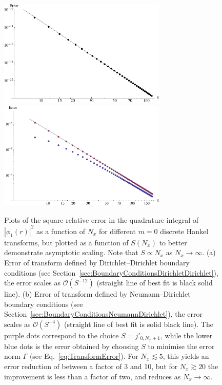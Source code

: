 \documentclass[aip,amsmath,amssymb,reprint,twocolumn]{revtex4-1}
\newcommand{\abs}[1]{\left|#1\right|}
\newcommand{\Nx}{{N_{x}}}
\begin{document}
\begin{figure}
  \includegraphics[width=8cm]{BesselDirichletErrorScaling}
  \includegraphics[width=8cm]{BesselNeumannErrorScaling}
  \caption{Plots of the square relative error in the quadrature integral of $\abs{\phi_1(r)}^2$ as a function of $\Nx$ for different $m=0$ discrete Hankel transforms, but plotted as a function of $S(\Nx)$ to better demonstrate asymptotic scaling.  Note that $S \propto \Nx$ as $\Nx \rightarrow \infty$. (a) Error of transform defined by Dirichlet--Dirichlet boundary conditions (see Section~\ref{sec:BoundaryConditionsDirichletDirichlet}), the error scales as $\mathcal{O}(S^{-12})$ (straight line of best fit is black solid line).  (b) Error of transform defined by Neumann--Dirichlet boundary conditions (see Section~\ref{sec:BoundaryConditionsNeumannDirichlet}), the error scales as $\mathcal{O}(S^{-4})$ (straight line of best fit is solid black line).  The purple dots correspond to the choice $S=j'_{0,\Nx+1}$, while the lower blue dots is the error obtained by choosing $S$ to minimise the error norm $\Gamma$ (see Eq.~\eqref{eq:TransformError}).  For $\Nx \lesssim 5$, this yields an error reduction of between a factor of 3 and 10, but for $\Nx \gtrsim 20$ the improvement is less than a factor of two, and reduces as $\Nx \rightarrow \infty$.\label{fig:ErrorScaling}}
\end{figure}
\end{document}
